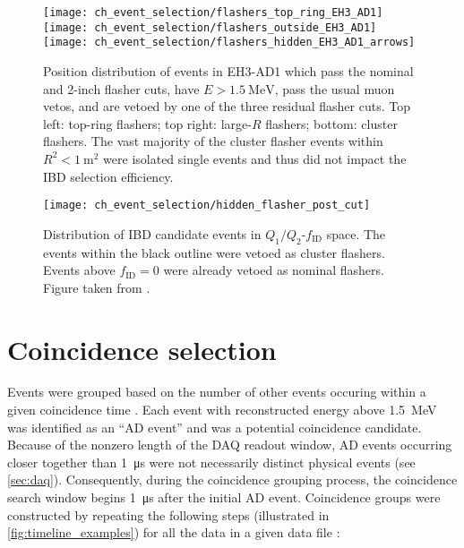 \begin{figure}
    \centering
    \texttt{[image: ch\_event\_selection/flashers\_top\_ring\_EH3\_AD1]}
    \texttt{[image: ch\_event\_selection/flashers\_outside\_EH3\_AD1]}\\
    \texttt{[image: ch\_event\_selection/flashers\_hidden\_EH3\_AD1\_arrows]}
    \caption[Residual flasher position distributions]{
        Position distribution of events in EH3-AD1
        which pass the nominal and 2-inch flasher cuts,
        have $E > \SI{1.5}{\MeV}$, pass the usual muon vetos,
        and are vetoed by one of the three residual flasher cuts.
        Top left: top-ring flashers;
        top right: large-$R$ flashers;
        bottom: cluster flashers.
        The vast majority of the cluster flasher events
        within $R^2 < \SI{1}{\m\squared}$
        were isolated single events
        and thus did not impact the IBD selection efficiency.
    }
    \label{fig:flasher_resid_pos}
\end{figure}

\begin{figure}
    \centering
    \texttt{[image: ch\_event\_selection/hidden\_flasher\_post\_cut]}
    \caption[Cluster flasher variables]{
        Distribution of IBD candidate events in $Q_1/Q_2$-$f_{\text{ID}}$ space.
        The events within the black outline were vetoed as
        cluster flashers.
        Events above $f_{\text{ID}}=0$ were already vetoed as nominal flashers.
        Figure taken from \cite{flasher_plots}.
    }
    \label{fig:hidden_flasher_cut}
\end{figure}


\section{Coincidence selection}
\label{sec:coincidence}

Events were grouped based on the number of other events
occuring within a given coincidence time \tc.
Each event with reconstructed energy above \SI{1.5}{\mega\electronvolt}
was identified as an ``AD event''
and was a potential coincidence candidate.
Because of the nonzero length of the DAQ readout window,
AD events occurring closer together than \SI{1}{\micro\second}
were not necessarily distinct physical events (see \cref{sec:daq}).
Consequently, during the coincidence grouping process,
the coincidence search window begins \SI{1}{\micro\second}
after the initial AD event.
Coincidence groups were constructed by repeating the following steps
(illustrated in \cref{fig:timeline_examples})
for all the data in a given data file \cite{thucoinc2015}:

